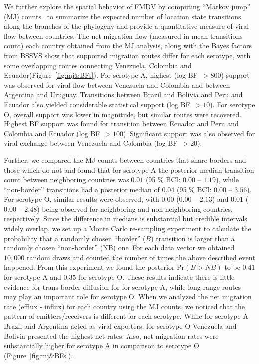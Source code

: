 \documentclass[10pt]{article}
\begin{document}
We further explore the spatial behavior of FMDV by  computing ``Markov jump'' (MJ) counts~\cite{Minin2008} to summarize the expected number of location state transitions along the branches of the phylogeny and provide a quantitative measure of viral flow between countries.
The net migration flow (measured in mean transitions count) each country obtained from the MJ analysis, along with the Bayes factors from BSSVS show that supported migration routes differ for each serotype, with some overlapping routes connecting Venezuela, Colombia and Ecuador(Figure~\ref{fig:mj&BFs}). 
For serotype A, highest (log BF~$>800$) support was observed for viral flow between Venezuela and Colombia and between Argentina and Uruguay.
Transitions between Brazil and Bolivia and Peru and Ecuador also yielded considerable statistical support (log BF~$>10$).
For serotype O, overall support was lower in magnitude, but similar routes were recovered.
Highest BF support was found for transition between Ecuador and Peru and Colombia and Ecuador (log BF~$>100$).
Significant support was also observed for viral exchange between Venezuela and Colombia (log BF~$>20$). 

Further, we compared the MJ counts between countries that share borders and those which do not and found that for serotype A the posterior median transition count between neighboring countries was $0.01$ (95 \% BCI: $0.00$ -- $1.19$), while ``non-border'' transitions had a posterior median of $0.04$ (95 \% BCI: $0.00$ --  $3.56$).
For serotype O, similar results were observed, with $0.00$ ($0.00$ -- $2.13$) and $0.01$ ($0.00$ -- $2.48$) being observed for neighboring and non-neighboring countries, respectively.
Since the difference in medians is substantial but credible intervals widely overlap, we set up a Monte Carlo re-sampling experiment to calculate the probability that a randomly chosen ``border'' ($B$) transition is larger than a randomly chosen ``non-border'' (NB) one.
For each data vector we obtained $10,000$ random draws and counted the number of times the above described event happened.
From this experiment we found the posterior $\mbox{Pr}(B>NB)$  to be $0.41$ for serotype A and $0.35$ for serotype O.
These results indicate there is little evidence for trans-border diffusion  for for serotype A, while long-range routes may play an important role for serotype O.
When we analyzed the net migration rate (efflux - influx) for each country using the MJ counts, we noticed that the pattern of emitters/receivers is different for each serotype.
While for serotype A Brazil and Argentina acted as viral exporters, for serotype O Venezuela and Bolivia presented the highest net rates.
Also, net migration rates were substantially higher for serotype A in comparison to serotype O (Figure~\ref{fig:mj&BFs}).
\end{document}
